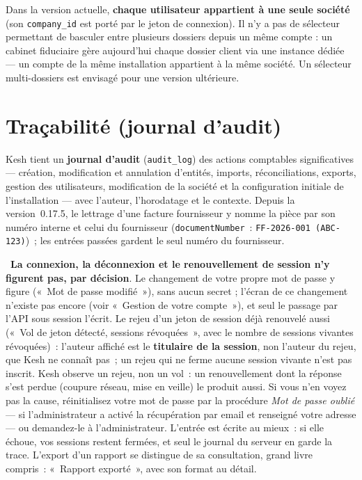 \documentclass[a4paper,11pt,oneside]{article}
\begin{document}
\begin{keshnote}
Dans la version actuelle, \textbf{chaque utilisateur appartient à une seule
société} (son \texttt{company\_id} est porté par le jeton de connexion). Il n'y a
pas de sélecteur permettant de basculer entre plusieurs dossiers depuis un même
compte : un cabinet fiduciaire gère aujourd'hui chaque dossier client via une
instance dédiée --- un compte de la même installation appartient à la même société. Un sélecteur multi-dossiers est envisagé pour une version
ultérieure.
\end{keshnote}

\section{Traçabilité (journal d'audit)}
\label{sec:tracabilite}

Kesh tient un \textbf{journal d'audit} (\texttt{audit\_log}) des actions
comptables significatives — création, modification et annulation d'entités,
imports, réconciliations, exports, gestion des utilisateurs, modification de
la société et la configuration initiale de l'installation — avec l'auteur,
l'horodatage et le contexte. Depuis la version~0.17.5, le lettrage d'une facture fournisseur y nomme la pièce par son numéro interne et celui du fournisseur (\texttt{documentNumber}~: \texttt{FF-2026-001 (ABC-123)})~; les entrées passées gardent le seul numéro du fournisseur.

\keshAttention\ \textbf{La connexion, la déconnexion et le renouvellement de session n'y
figurent pas, par décision}. Le changement de votre propre mot de passe y figure («~Mot de
passe modifié~»), sans aucun secret ; l'écran de ce changement n'existe pas encore (voir «~Gestion de votre
compte~»), et seul le passage par l'API sous session l'écrit. Le rejeu d'un jeton de session déjà renouvelé aussi («~Vol de jeton détecté,
sessions révoquées~», avec le nombre de sessions vivantes révoquées)~: l'auteur affiché est le
\textbf{titulaire de la session}, non l'auteur du rejeu, que Kesh ne connaît pas~; un rejeu qui
ne ferme aucune session vivante n'est pas inscrit. Kesh observe un rejeu, non un vol~: un
renouvellement dont la réponse s'est perdue (coupure réseau, mise en veille) le produit aussi.
Si vous n'en voyez pas la cause, réinitialisez votre mot de passe par la procédure \emph{Mot de passe oublié} --- si l'administrateur a activé la récupération par email et renseigné votre adresse --- ou demandez-le à l'administrateur. L'entrée est écrite au mieux~: si
elle échoue, vos sessions restent fermées, et seul le journal du serveur en garde la trace.
L'export d'un rapport se distingue de sa
consultation, grand livre compris~: «~Rapport exporté~», avec son format au détail.
\end{document}
